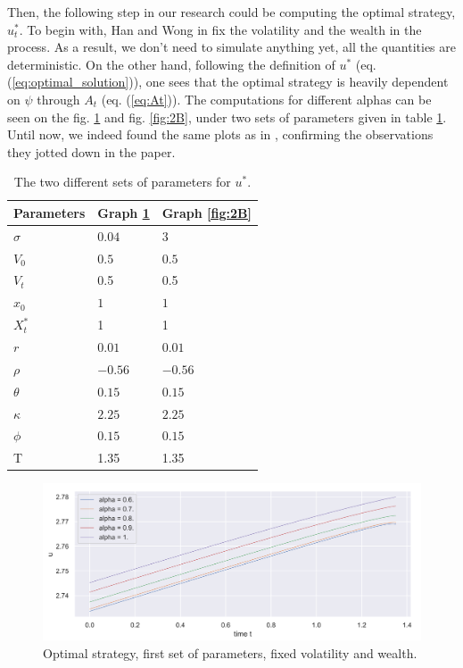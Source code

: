 Then, the following step in our research could be computing the optimal strategy, $u^*_t$. To begin with, Han and Wong in \cite{HanWong} fix the volatility and the wealth in the process. As a result, we don't need to simulate anything yet, all the quantities are deterministic. On the other hand, following the definition of $u^*$ (eq. (\ref{eq:optimal_solution})), one sees  that the optimal strategy is heavily dependent on $\psi$ through $A_t$ (eq. (\ref{eq:At})). 
The computations for different alphas can be seen on the fig. \ref{fig:2A} and fig. \ref{fig:2B}, under two sets of parameters given in table \ref{tab:coef2}. Until now, we indeed found the same plots as in \cite{HanWong}, confirming the observations they jotted down in the paper.

\begin{table}
\begin{center}
\begin{tabular}{   m{4.5 cm} | m{4.5 cm} | m{4.5 cm}   } 
\hline
 Parameters & Graph \ref{fig:2A} & Graph \ref{fig:2B} \\ 
\hline
\hline
$\sigma$ & $0.04$ & $3$ \\
\hline
$V_0$ & $0.5$ & $0.5$ \\
\hline
$V_t$ & 0.5 & 0.5 \\
\hline
$x_0$ & $1$ & $1$ \\
\hline
$X_t^*$ & 1 & 1 \\
\hline
$r$ & $0.01$ & $0.01$ \\
\hline
$\rho$ &$ -0.56$ &  $-0.56$\\
\hline
$\theta$  &  $0.15$ &$ 0.15$ \\
\hline
$\kappa$ & $2.25$ & $2.25$ \\
\hline
$\phi$ & $0.15$ &  $0.15$ \\
\hline
T & 1.35 & 1.35 \\
\hline

\end{tabular}
\caption{The two different sets of parameters for $u^*$.}
\label{tab:coef2}
\end{center}
\end{table}



\begin{figure}
\centering
\includegraphics[width = 0.7 \textwidth]{../addition_part/images/numerical_studies/2a.png}
\caption{Optimal strategy, first set of parameters, fixed volatility and wealth.}
\label{fig:2A}
\end{figure}

